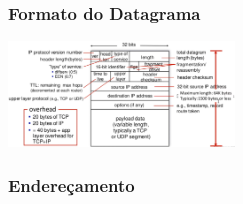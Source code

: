         \subsubsection*{Formato do Datagrama}

            \begin{center}
                \includegraphics[width=0.45\textwidth]{img/cap-04/formato-datagrama.png}
            \end{center}

        \subsubsection*{Endereçamento}
           
